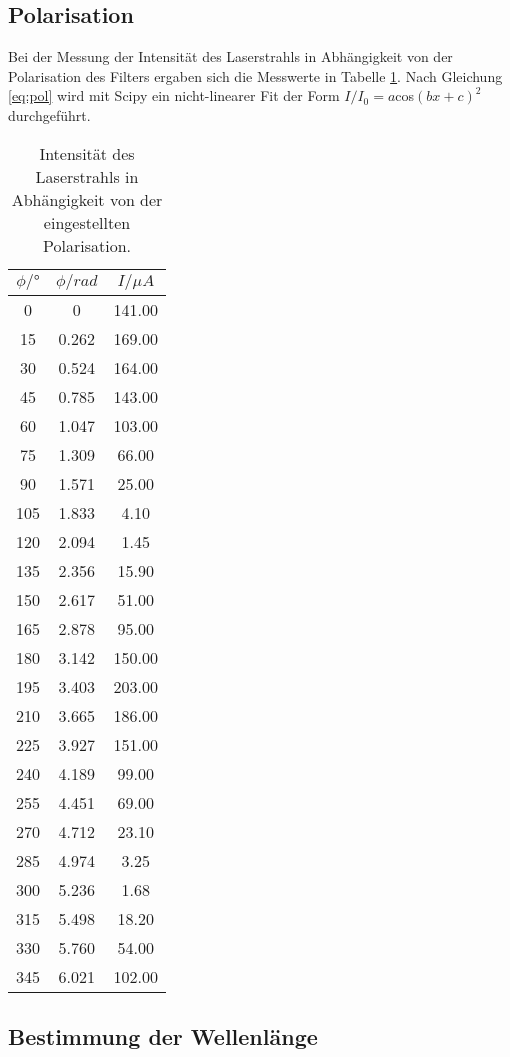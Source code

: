 \subsection{Polarisation}

Bei der Messung der Intensität des Laserstrahls in Abhängigkeit von der Polarisation des Filters ergaben sich die
Messwerte in Tabelle \ref{tab:pol_data}.
Nach Gleichung \ref{eq:pol} wird mit Scipy \cite{scipy} ein nicht-linearer Fit der Form $I/I_0 = a$cos$(bx+c)^2$ durchgeführt.

\begin{table}
\centering
\caption{Intensität des Laserstrahls in Abhängigkeit von der eingestellten Polarisation.}
\label{tab:pol_data}
\begin{tabular}{c c c}
\toprule
$\phi/°$ & $\phi/rad$ & $I/\mu A$ \\
\midrule
0 & 0 & 141.00 \\
15 & 0.262 & 169.00 \\
30 & 0.524 & 164.00 \\
45 & 0.785 & 143.00 \\
60 & 1.047 & 103.00 \\
75 & 1.309 & 66.00 \\
90 & 1.571 & 25.00 \\
105 & 1.833 & 4.10 \\
120 & 2.094 & 1.45 \\
135 & 2.356 & 15.90 \\
150 & 2.617 & 51.00 \\
165 & 2.878 & 95.00 \\
180 & 3.142 & 150.00 \\
195 & 3.403 & 203.00 \\
210 & 3.665 & 186.00 \\
225 & 3.927 & 151.00 \\
240 & 4.189 & 99.00 \\
255 & 4.451 & 69.00 \\
270 & 4.712 & 23.10 \\
285 & 4.974 & 3.25 \\
300 & 5.236 & 1.68 \\
315 & 5.498 & 18.20 \\
330 & 5.760 & 54.00 \\
345 & 6.021 & 102.00 \\
\bottomrule
\end{tabular}
\end{table}


\subsection{Bestimmung der Wellenlänge}


